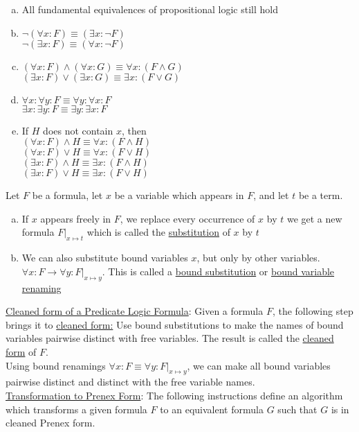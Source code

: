 \documentclass[a4paper]{article}
\newcommand{\ul}{\underline}
\begin{document}
\begin{enumerate}[(a)]
	\item All fundamental equivalences of propositional logic still hold
	\item $\neg(\forall x:F)\equiv (\exists x:\neg F)$\\
	$\neg(\exists x:F)\equiv (\forall x:\neg F)$
	\item $(\forall x : F)\wedge (\forall x : G)\equiv \forall x : (F\wedge G)$\\
	$(\exists x : F)\vee (\exists x : G)\equiv \exists x : (F\vee G)$
	\item $\forall x:\forall y: F\equiv\forall y:\forall x:F$\\
	$\exists x:\exists y: F\equiv\exists y:\exists x:F$
	\item If $H$ does not contain $x$, then\\
	$(\forall x: F)\wedge H\equiv \forall x:(F\wedge H)$\\
	$(\forall x: F)\vee H\equiv \forall x:(F\vee H)$\\
	$(\exists x: F)\wedge H\equiv \exists x:(F\wedge H)$\\
	$(\exists x: F)\vee H\equiv \exists x:(F\vee H)$\\
\end{enumerate}
Let $F$ be a formula, let $x$ be a variable which appears in $F$, and let $t$ be a term.
\begin{enumerate}[(a)]
	\item If $x$ appears freely in $F$, we replace every occurrence of $x$ by $t$ we get a new formula $F\vert_{x\mapsto t}$ which is called the \ul{substitution} of $x$ by $t$
	\item We can also substitute bound variables $x$, but only by other variables. $\forall x:F\rightarrow \forall y:F\vert_{x\mapsto y}$. This is called a \ul{bound substitution} or \ul{bound variable renaming}
\end{enumerate}
\ul{Cleaned form of a Predicate Logic Formula}: Given a formula $F$, the following step brings it to \ul{cleaned form:} Use bound substitutions to make the names of bound variables pairwise distinct with free variables. The result is called the \ul{cleaned form} of $F$.\\
Using bound renamings $\forall x : F\equiv \forall y : F\vert_{x\mapsto y}$, we can make all bound variables pairwise distinct and distinct with the free variable names.\\
\ul{Transformation to Prenex Form}: The following instructions define an algorithm which transforms a given formula $F$ to an equivalent formula $G$ such that $G$ is in cleaned Prenex form.
\end{document}
